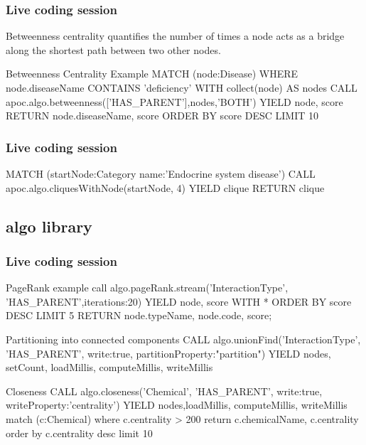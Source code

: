 \documentclass[12pt]{beamer}
\begin{document}
    \begin{frame}
        \frametitle{Live coding session}
        \begin{Definition}
            Betweenness centrality quantifies the number of times a node acts as a bridge along the shortest path between two other nodes.\footnotemark
        \end{Definition}
        \begin{block}{Betweenness Centrality Example}
            MATCH (node:Disease)
            WHERE node.diseaseName CONTAINS 'deficiency'
            WITH collect(node) AS nodes
            CALL apoc.algo.betweenness(['HAS\_PARENT'],nodes,'BOTH') YIELD node, score
            RETURN node.diseaseName, score
            ORDER BY score DESC LIMIT 10
        \end{block}
    \end{frame}
    
    \begin{frame}
        \frametitle{Live coding session}
        MATCH (startNode:Category {name:'Endocrine system disease'})
        CALL apoc.algo.cliquesWithNode(startNode, 4) YIELD clique
        RETURN clique
    \end{frame}
    
    \subsection{algo library}
    \begin{frame}
        \frametitle{Live coding session}
        \begin{block}{PageRank example}
            call algo.pageRank.stream('InteractionType', 'HAS\_PARENT',{iterations:20}) YIELD node, score
            WITH * ORDER BY score DESC LIMIT 5
            RETURN node.typeName, node.code, score;
        \end{block}
        \begin{block}{Partitioning into connected components}
            CALL algo.unionFind('InteractionType', 'HAS\_PARENT', {write:true, partitionProperty:"partition"})
            YIELD nodes, setCount, loadMillis, computeMillis, writeMillis
        \end{block}
        \begin{block}{Closeness}%
            CALL algo.closeness('Chemical', 'HAS\_PARENT', {write:true, writeProperty:'centrality'})
            YIELD nodes,loadMillis, computeMillis, writeMillis\\
            
            match (c:Chemical) where c.centrality > 200 return c.chemicalName, c.centrality order by c.centrality desc limit 10
        \end{block}
    \end{frame}
    
\end{document}
